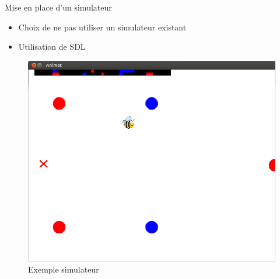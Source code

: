 \documentclass{beamer}
\begin{document}
\begin{frame}
  \begin{block}{Mise en place d'un simulateur}
    \begin{itemize}
      \item Choix de ne pas utiliser un simulateur existant
      \item Utilisation de SDL
    \end{itemize}
  \end{block}
  \begin{figure}
    \centering
    \includegraphics[scale=0.2]{one_run.png}
    \caption{Exemple simulateur}
  \end{figure}
\end{frame}
\end{document}
